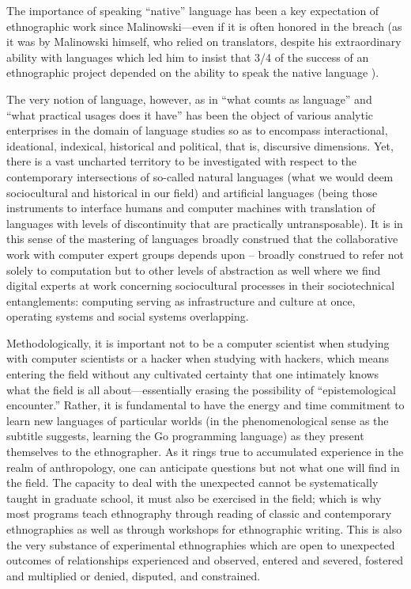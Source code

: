 \documentclass[10pt,letter,oneside]{scrartcl}
\begin{document}

The importance of speaking ``native'' language has been a key
expectation of ethnographic work since Malinowski---even if it is
often honored in the breach (as it was by Malinowski himself, who
relied on translators, despite his extraordinary ability with 
languages which led him to insist that 3/4 of the success of 
an ethnographic project depended on the ability to speak the 
native language \cite{Young2004}).
 
The very notion of language, however, as in ``what counts as
language'' and ``what practical usages does it have'' has been the
object of various analytic enterprises in the domain of language
studies so as to encompass interactional, ideational, indexical,
historical and political, that is, discursive dimensions. Yet, 
there is a vast uncharted territory to be investigated with 
respect to the contemporary intersections of so-called natural 
languages (what we would deem sociocultural and historical in our
field) and artificial languages (being those instruments to interface 
humans and computer machines with translation of languages with 
levels of discontinuity that are practically untransposable). It is 
in this sense of the mastering of languages broadly construed that 
the collaborative work with computer expert groups depends upon -- 
broadly construed to refer not solely to computation but to other 
levels of abstraction as well where we find digital experts at 
work concerning sociocultural processes in their sociotechnical 
entanglements: computing serving as infrastructure and culture at 
once, operating systems and social systems overlapping. 

Methodologically, it is important not to be a computer
scientist when studying with computer scientists or a hacker when 
studying with hackers, which means entering the field without any cultivated
certainty that one intimately knows what the field is all
about---essentially erasing the possibility of ``epistemological
encounter.''  Rather, it is fundamental to have the energy and time
commitment to learn new languages of particular worlds (in the
phenomenological sense as the subtitle suggests, learning the Go programming
language) as they present themselves to the ethnographer.  
As it rings true to accumulated experience in the realm
of anthropology, one can anticipate questions but not what one will
find in the field. The capacity to deal with the unexpected cannot be
systematically taught in graduate school, it must also be exercised in
the field; which is why most programs teach ethnography through
reading of classic and contemporary ethnographies as well as through
workshops for ethnographic writing. This is also the very substance of
experimental ethnographies which are open to unexpected outcomes of
relationships experienced and observed, entered and severed, fostered 
and multiplied or denied, disputed, and constrained.
\end{document}
